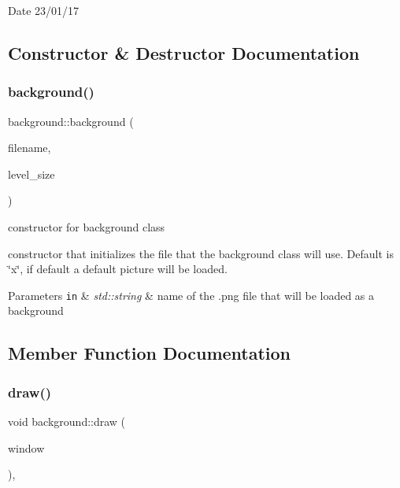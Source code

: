 \begin{DoxyDate}{Date}
23/01/17 
\end{DoxyDate}


\subsection{Constructor \& Destructor Documentation}
\mbox{\label{classbackground_ad199eead2ef4a4d867f2542d3a152471}} 
\subsubsection{\texorpdfstring{background()}{background()}}
{\footnotesize\ttfamily background\+::background (\begin{DoxyParamCaption}\item[{std\+::string}]{filename,  }\item[{sf\+::\+Vector2f}]{level\+\_\+size }\end{DoxyParamCaption})}



constructor for background class 

constructor that initializes the file that the background class will use. Default is \char`\"{}x\char`\"{}, if default a default picture will be loaded.


\begin{DoxyParams}[1]{Parameters}
\mbox{\tt in}  & {\em std\+::string} & name of the .png file that will be loaded as a background \\
\hline
\end{DoxyParams}


\subsection{Member Function Documentation}
\mbox{\label{classbackground_a41736f9a00defad1e84b3a8099c887e2}} 
\subsubsection{\texorpdfstring{draw()}{draw()}}
{\footnotesize\ttfamily void background\+::draw (\begin{DoxyParamCaption}\item[{sf\+::\+Render\+Window \&}]{window }\end{DoxyParamCaption})\hspace{0.3cm}{\ttfamily [override]}, {\ttfamily [virtual]}}



